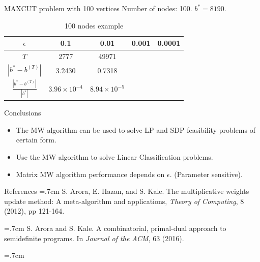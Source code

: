\documentclass{beamer}
\begin{document}
\begin{frame}{MAXCUT problem with 100 vertices}
Number of nodes: 100. $b^* = 8190$. 
\begin{table}[htbp]\label{100nodestable}
\centering
\begin{tabular}{||c|c|c|c|c||}
\hline
$\epsilon$ & 0.1 & 0.01 & 0.001 & 0.0001 \\
\hline
$T$ & 2777 & 49971 &  & \\
\hline
$|b^* - b^{(T)}|$ & 3.2430 & 0.7318 &  & \\
\hline
$\frac{|b^* - b^{(T)}|}{|b^*|}$ & $3.96\times 10^{-4}$  & $8.94\times 10^{-5}$ & & \\
\hline
\end{tabular}
\caption{100 nodes example}
\end{table}

\end{frame}

\begin{frame}{Conclusions}
\begin{itemize}
\item The MW algorithm can be used to solve LP and SDP feasibility problems of certain form.
\item 
Use the MW algorithm to solve Linear Classification problems.
\item
Matrix MW algorithm performance depends on $\epsilon$. (Parameter sensitive).
\end{itemize}
\end{frame}

\begin{frame}{References}
\noindent
\hangindent=.7cm 
S. Arora, E. Hazan, and S. Kale. The multiplicative weights update method: A meta-algorithm and applications, \emph{Theory of Computing}, 8 (2012), pp 121-164.

\vspace{.5cm}
\noindent
\hangindent=.7cm 
S. Arora and S. Kale. A combinatorial, primal-dual approach to semidefinite programs. In \emph{Journal of the ACM}, 63 (2016).

\vspace{.5cm}
\noindent
\hangindent=.7cm 

\end{frame}
\end{document}
